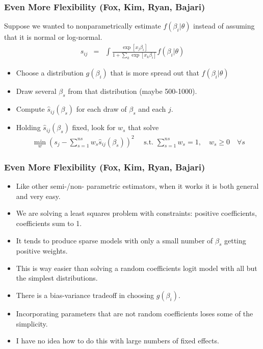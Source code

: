 \documentclass[xcolor=pdftex,dvipsnames,table,mathserif]{beamer}
\begin{document}
\begin{frame}
\frametitle{Even More Flexibility (Fox, Kim, Ryan, Bajari)}
Suppose we wanted to nonparametrically estimate $f(\beta_i | \theta)$ instead of assuming that it is normal or log-normal.
\begin{eqnarray*}
s_{ij} &=& \int \frac{\exp[x_{j} \beta_i  ]}{1+\sum_k \exp[x_{k} \beta_i  ]} f(\beta_i | \theta)
\end{eqnarray*}
\begin{itemize}
\item Choose a distribution $g(\beta_i)$ that is more spread out that $f(\beta_i | \theta)$
\item Draw several $\beta_{s}$ from that distribution (maybe 500-1000).
\item Compute $\hat{s}_{ij}(\beta_s)$ for each draw of $\beta_s$ and each $j$.
\item Holding $\hat{s}_{ij}(\beta_s)$ fixed, look for $w_s$ that solve
\begin{eqnarray*}
\min_w \left(s_j -  \sum_{s=1}^{ns} w_s \hat{s}_{ij}(\beta_s) \right)^2 \quad \mbox{ s.t. } \sum_{s=1}^{ns} w_s = 1, \quad w_s \geq 0 \quad \forall s
\end{eqnarray*}
\end{itemize}
\end{frame}

\begin{frame}
\frametitle{Even More Flexibility (Fox, Kim, Ryan, Bajari)}
\begin{itemize}
\item Like other semi-/non- parametric estimators, when it works it is both general and very easy.
\item We are solving a least squares problem with constraints: positive coefficients, coefficients sum to 1.
\item It tends to produce \alert{sparse models} with only a small number of $\beta_s$ getting positive weights.
\item This is way easier than solving a random coefficients logit model with all but the simplest distributions.
\item There is a bias-variance tradeoff in choosing $g(\beta_i)$.
\item Incorporating parameters that are not random coefficients loses some of the simplicity.
\item I have no idea how to do this with large numbers of fixed effects.
\end{itemize}
\end{frame}
\end{document}

